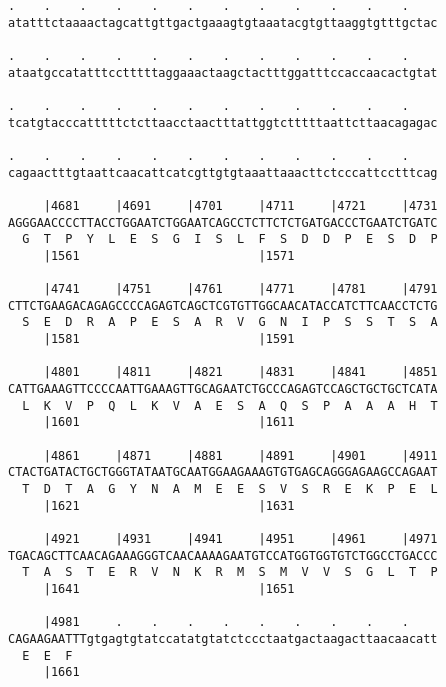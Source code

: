 \documentclass{article}
\begin{document}
\begin{Verbatim}
.    .    .    .    .    .    .    .    .    .    .    .    
atatttctaaaactagcattgttgactgaaagtgtaaatacgtgttaaggtgtttgctac
                                                            
.    .    .    .    .    .    .    .    .    .    .    .    
ataatgccatatttcctttttaggaaactaagctactttggatttccaccaacactgtat
                                                            
.    .    .    .    .    .    .    .    .    .    .    .    
tcatgtacccatttttctcttaacctaactttattggtctttttaattcttaacagagac
                                                            
.    .    .    .    .    .    .    .    .    .    .    .    
cagaactttgtaattcaacattcatcgttgtgtaaattaaacttctcccattcctttcag
                                                            
     |4681     |4691     |4701     |4711     |4721     |4731
AGGGAACCCCTTACCTGGAATCTGGAATCAGCCTCTTCTCTGATGACCCTGAATCTGATC
  G  T  P  Y  L  E  S  G  I  S  L  F  S  D  D  P  E  S  D  P
     |1561                         |1571                    
  
     |4741     |4751     |4761     |4771     |4781     |4791
CTTCTGAAGACAGAGCCCCAGAGTCAGCTCGTGTTGGCAACATACCATCTTCAACCTCTG
  S  E  D  R  A  P  E  S  A  R  V  G  N  I  P  S  S  T  S  A
     |1581                         |1591                    
  
     |4801     |4811     |4821     |4831     |4841     |4851
CATTGAAAGTTCCCCAATTGAAAGTTGCAGAATCTGCCCAGAGTCCAGCTGCTGCTCATA
  L  K  V  P  Q  L  K  V  A  E  S  A  Q  S  P  A  A  A  H  T
     |1601                         |1611                    
  
     |4861     |4871     |4881     |4891     |4901     |4911
CTACTGATACTGCTGGGTATAATGCAATGGAAGAAAGTGTGAGCAGGGAGAAGCCAGAAT
  T  D  T  A  G  Y  N  A  M  E  E  S  V  S  R  E  K  P  E  L
     |1621                         |1631                    
  
     |4921     |4931     |4941     |4951     |4961     |4971
TGACAGCTTCAACAGAAAGGGTCAACAAAAGAATGTCCATGGTGGTGTCTGGCCTGACCC
  T  A  S  T  E  R  V  N  K  R  M  S  M  V  V  S  G  L  T  P
     |1641                         |1651                    
  
     |4981     .    .    .    .    .    .    .    .    .    
CAGAAGAATTTgtgagtgtatccatatgtatctccctaatgactaagacttaacaacatt
  E  E  F                                                   
     |1661                                                  
  

\end{Verbatim}
\end{document}
